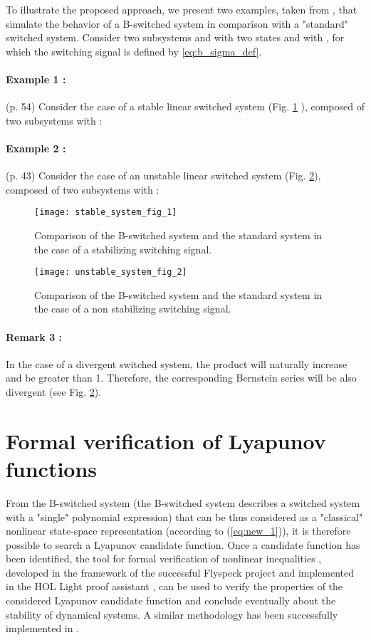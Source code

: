 \documentclass[12pt]{article}
\begin{document}
To illustrate the proposed approach, we present two examples, taken from \cite{Bourdais}, that simulate the behavior of a B-switched system in comparison with a "standard" switched 
system. Consider two subsystems  and  with two states  and  with , for which the switching signal is defined by \ref{eq:b_sigma_def}.
\paragraph{Example 1 :} (p. 54) Consider the case of a stable linear switched system (Fig. \ref{fig:stable_sys} ), composed of two subsystems 
 with :

\paragraph{Example 2 :} (p. 43) Consider the case of an unstable linear switched system (Fig. \ref{fig:unstable_sys}), composed of two subsystems 
 with :

\begin{figure}[!h]
\centering
\texttt{[image: stable\_system\_fig\_1]}
\caption{Comparison of the B-switched system and the standard system in the case of a stabilizing switching signal.}
\label{fig:stable_sys}
\end{figure}
\begin{figure}[!h]
\centering
\texttt{[image: unstable\_system\_fig\_2]}
\caption{Comparison of the B-switched system and the standard system in the case of a non stabilizing switching signal.}
\label{fig:unstable_sys}
\end{figure}
\paragraph{Remark 3 :} In the case of a divergent switched system, the product  will naturally increase and be greater than 1. Therefore, the corresponding Bernstein series 
will be also divergent (see Fig. \ref{fig:unstable_sys}).

\newpage
\section{Formal verification of Lyapunov functions}
From the B-switched system (the B-switched system describes a switched system with a "single" polynomial expression) that can be thus considered as a "classical" nonlinear state-space representation
(according to (\ref{eq:new_1})), it is therefore possible to search a Lyapunov candidate function. Once a candidate function has been identified, the tool 
for formal verification of nonlinear inequalities \cite{solo}, developed in the framework of the successful Flyspeck project \cite{flys} and implemented in the HOL Light proof assistant 
\cite{hol}, can be used to verify the properties of the considered Lyapunov candidate function and conclude eventually about the stability of dynamical systems. A similar methodology has been successfully
implemented in \cite{Why}.
\end{document}
